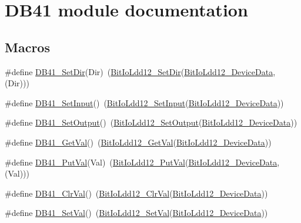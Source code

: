\hypertarget{group___d_b41__module}{}\section{D\+B41 module documentation}
\label{group___d_b41__module}
\subsection*{Macros}
\begin{DoxyCompactItemize}
\item 
\#define \hyperlink{group___d_b41__module_gacd09e2b28168f293ca5e87389d611946}{D\+B41\+\_\+\+Set\+Dir}(Dir)~(\hyperlink{group___bit_io_ldd12__module_ga540c0e8c513ca036a0066aab8833f0ad}{Bit\+Io\+Ldd12\+\_\+\+Set\+Dir}(\hyperlink{group___bit_io_ldd12__module_ga7332a1a453879ccef57a59ed20d8fee5}{Bit\+Io\+Ldd12\+\_\+\+Device\+Data}, (Dir)))
\item 
\#define \hyperlink{group___d_b41__module_gaa1db55b4896cbc1f99a174982e295b6d}{D\+B41\+\_\+\+Set\+Input}()~(\hyperlink{group___bit_io_ldd12__module_gaf2e24cfdf7dd3071178d0061abb29c56}{Bit\+Io\+Ldd12\+\_\+\+Set\+Input}(\hyperlink{group___bit_io_ldd12__module_ga7332a1a453879ccef57a59ed20d8fee5}{Bit\+Io\+Ldd12\+\_\+\+Device\+Data}))
\item 
\#define \hyperlink{group___d_b41__module_ga5c1975bcc0f0c43162e4c157d3c60fa4}{D\+B41\+\_\+\+Set\+Output}()~(\hyperlink{group___bit_io_ldd12__module_gab9c2b2a95e81ed484e4328f795f0e827}{Bit\+Io\+Ldd12\+\_\+\+Set\+Output}(\hyperlink{group___bit_io_ldd12__module_ga7332a1a453879ccef57a59ed20d8fee5}{Bit\+Io\+Ldd12\+\_\+\+Device\+Data}))
\item 
\#define \hyperlink{group___d_b41__module_gaa3cd50d8ce5a5cccce3ae63107148c85}{D\+B41\+\_\+\+Get\+Val}()~(\hyperlink{group___bit_io_ldd12__module_gab808ab6ca05818b3bfaba89eee1397b0}{Bit\+Io\+Ldd12\+\_\+\+Get\+Val}(\hyperlink{group___bit_io_ldd12__module_ga7332a1a453879ccef57a59ed20d8fee5}{Bit\+Io\+Ldd12\+\_\+\+Device\+Data}))
\item 
\#define \hyperlink{group___d_b41__module_ga2c6f87e738672ab445ac1a190768ba14}{D\+B41\+\_\+\+Put\+Val}(Val)~(\hyperlink{group___bit_io_ldd12__module_ga9db76c4359c6a7420209b0a4c6c4b940}{Bit\+Io\+Ldd12\+\_\+\+Put\+Val}(\hyperlink{group___bit_io_ldd12__module_ga7332a1a453879ccef57a59ed20d8fee5}{Bit\+Io\+Ldd12\+\_\+\+Device\+Data}, (Val)))
\item 
\#define \hyperlink{group___d_b41__module_ga13f459fff4925b0bba3f97887c7a5e7a}{D\+B41\+\_\+\+Clr\+Val}()~(\hyperlink{group___bit_io_ldd12__module_ga8a874582bd5c8203b3dfb47ea504ae12}{Bit\+Io\+Ldd12\+\_\+\+Clr\+Val}(\hyperlink{group___bit_io_ldd12__module_ga7332a1a453879ccef57a59ed20d8fee5}{Bit\+Io\+Ldd12\+\_\+\+Device\+Data}))
\item 
\#define \hyperlink{group___d_b41__module_ga9e42f8d7a6c59804db4317d07de737f2}{D\+B41\+\_\+\+Set\+Val}()~(\hyperlink{group___bit_io_ldd12__module_ga2cdd9908f20433ebead9d031e6abe07c}{Bit\+Io\+Ldd12\+\_\+\+Set\+Val}(\hyperlink{group___bit_io_ldd12__module_ga7332a1a453879ccef57a59ed20d8fee5}{Bit\+Io\+Ldd12\+\_\+\+Device\+Data}))
\end{DoxyCompactItemize}


